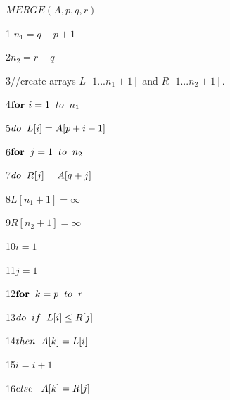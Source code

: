 \documentclass[12 pt,a4paper]{report}
\begin{document}
$MERGE(A,p,q,r)$


1\hspace{0.5cm} $n_1=q-p+1$


2\hspace{0.6cm}$n_2=r-q$


3\hspace{0.6cm}//create arrays $L[1...n_1+1]$ and $R[1...n_2+1]$.


4\hspace{0.6cm}$\textbf{for } i=1\hspace{0.2cm}to \hspace{0.2cm}n_1$


5\hspace{1cm}$do\hspace{0.2cm}L[i]=A[p+i-1]$

6\hspace{0.6cm}$\textbf{for}\hspace{0.2cm} j=1\hspace{0.2cm}to\hspace{0.2cm}n_2$

7\hspace{1cm}$do\hspace{0.2cm} R[j]=A[q+j]$

8\hspace{0.6cm}$L[n_1+1]=\infty$

9\hspace{0.6cm}$R[n_2+1]=\infty$

10\hspace{0.5cm}$i=1$

11\hspace{0.5cm}$j=1$

12\hspace{0.5cm}$\textbf{for}\hspace{0.2cm}k=p\hspace{0.2cm}to\hspace{0.2cm}r$

13\hspace{1cm}$do\hspace{0.2cm}if\hspace{0.2cm}L[i]\leq R[j]$

14\hspace{1.5cm}$then\hspace{0.2cm}A[k]=L[i]$

15\hspace{1.5cm}$i=i+1$

16\hspace{1cm}$else\hspace{0.3cm}A[k]=R[j]$
\end{document}
